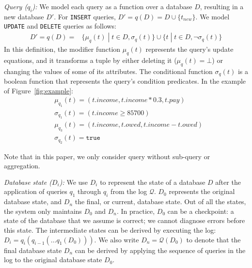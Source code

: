 \smallskip
\noindent
\emph{Query ($q_i$):} We model each query as a function over a
database $D$, resulting in a new database $D'$. For \texttt{INSERT}
queries, $D'=q(D)=D\cup\{t_{new}\}$.
We model \texttt{UPDATE} and \texttt{DELETE} queries as follows:  
\begin{align*}
    D'=q(D)= &\{\mu_{q}(t)\;|\;t\in D, \sigma_{q}(t)\}%
    \cup\{t\;|\;t\in D, \neg\sigma_{q}(t)\}%
\end{align*}
% 
In this definition, the modifier function $\mu_q(t)$ represents the query's update equations, and it transforms a tuple by either deleting it ($\mu_q(t)=\bot$) or changing the values of some of its attributes.
The conditional function $\sigma_q(t)$ is a boolean function that represents the query's condition predicates.  In the example of Figure~\ref{fig:example}:
\begin{align*}
    &\mu_{q_1}(t)=(t.income, t.income*0.3, t.pay)\\
    &\sigma_{q_1}(t)=(t.income\ge 85700)\\
    &\mu_{q_3}(t)=(t.income, t.owed, t.income-t.owed)\\
    &\sigma_{q_2}(t)=\texttt{true}
\end{align*} 
\iffalse
\begin{align*}
    &\mu_{q_1}(t)=(30, t.income, t.owed)\\
    &\sigma_{q_1}(t)=(t.income\ge 85700)\\
    &\mu_{q_2}(t)=(t.rate, t.income, \frac{t.income\cdot t.rate}{100})\\
    &\sigma_{q_2}(t)=\texttt{true}
\end{align*} 
\fi
Note that in this paper, we only consider query without sub-query or aggregation. 
% 


\smallskip
\noindent
\emph{Database state ($D_i$):}
We use $D_i$ to represent the state of a database $D$ after the application of
queries $q_1$ through $q_i$ from the log $\mathcal{Q}$. $D_0$ represents the
original database state, and $D_n$ the final, or current, database state. Out
of all the states, the system only maintains $D_0$ and $D_n$. In practice,
$D_0$ can be a checkpoint: a state of the database that we assume is correct;
we cannot diagnose errors before this state. The intermediate states can be
derived by executing the log: $D_i=q_i(q_{i-1}(\dots q_1(D_0)))$. We also
write $D_n=\mathcal{Q}(D_0)$ to denote that the final database state $D_n$ can
be derived by applying the sequence of queries in the log to the original
database state $D_0$.

